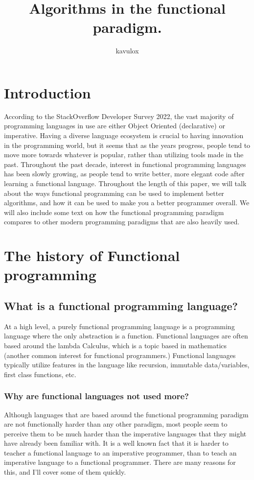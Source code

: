 \documentclass{report}
\title{Algorithms in the functional paradigm.}
\author{kavulox}
\begin{document}
\maketitle


\tableofcontents



\chapter{Introduction}

According to the StackOverflow Developer Survey 2022, the vast majority of programming languages in use are either Object Oriented (declarative) or imperative. Having a diverse language ecosystem is crucial to having innovation in the programming world, but it seems that as the years progress, people tend to move more towards whatever is popular, rather than utilizing tools made in the past.
Throughout the past decade, interest in functional programming languages has been slowly growing, as people tend to write better, more elegant code after learning a functional language.
Throughout the length of this paper, we will talk about the ways functional programming can be used to implement better algorithms, and how it can be used to make you a better programmer overall. We will also include some text on how the functional programming paradigm compares to other modern programming paradigms that are also heavily used.

\chapter{The history of Functional programming}
\section{What is a functional programming language?}
At a high level, a purely functional programming language is a programming language where the only abstraction is a function. Functional languages are often based around the lambda Calculus, which is a topic based in mathematics (another common interest for functional programmers.) 
Functional languages typically utilize features in the language like recursion, immutable data/variables, first class functions, etc.
\subsection{Why are functional languages not used more?}
Although languages that are based around the functional programming paradigm are not functionally harder than any other paradigm, most people seem to perceive them to be much harder than the imperative languages that they might have already been familiar with.
It is a well known fact that it is harder to teacher a functional language to an imperative programmer, than to teach an imperative language to a functional programmer. There are many reasons for this, and I'll cover some of them quickly.
\end{document}

